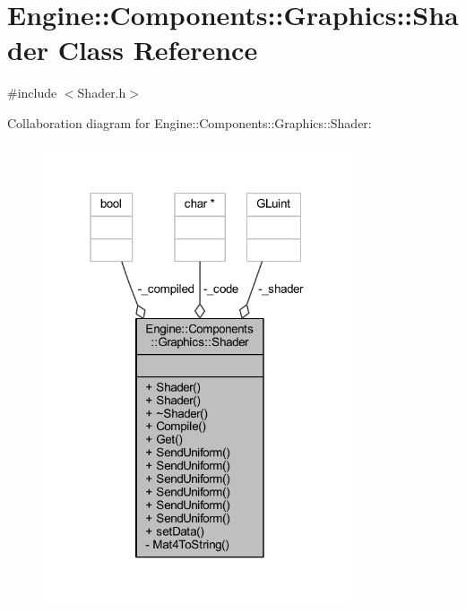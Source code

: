 \hypertarget{classEngine_1_1Components_1_1Graphics_1_1Shader}{}\section{Engine\+:\+:Components\+:\+:Graphics\+:\+:Shader Class Reference}
\label{classEngine_1_1Components_1_1Graphics_1_1Shader}


{\ttfamily \#include $<$Shader.\+h$>$}



Collaboration diagram for Engine\+:\+:Components\+:\+:Graphics\+:\+:Shader\+:
\nopagebreak
\begin{figure}[H]
\begin{center}
\leavevmode
\includegraphics[width=259pt]{classEngine_1_1Components_1_1Graphics_1_1Shader__coll__graph}
\end{center}
\end{figure}
